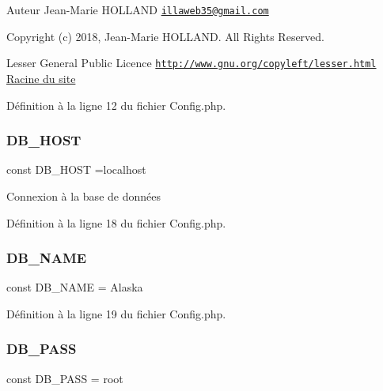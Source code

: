 \begin{DoxyAuthor}{Auteur}
Jean-\/\+Marie H\+O\+L\+L\+A\+ND \href{mailto:illaweb35@gmail.com}{\tt illaweb35@gmail.\+com} 
\end{DoxyAuthor}
\begin{DoxyCopyright}{Copyright}
(c) 2018, Jean-\/\+Marie H\+O\+L\+L\+A\+ND. All Rights Reserved.
\end{DoxyCopyright}
Lesser General Public Licence \href{http://www.gnu.org/copyleft/lesser.html}{\tt http\+://www.\+gnu.\+org/copyleft/lesser.\+html} \hyperlink{}{Racine du site }

Définition à la ligne 12 du fichier Config.\+php.

\mbox{\label{_config_8php_a293363d7988627f671958e2d908c202a}} 
\subsubsection{\texorpdfstring{D\+B\+\_\+\+H\+O\+ST}{DB\_HOST}}
{\footnotesize\ttfamily const D\+B\+\_\+\+H\+O\+ST =\textquotesingle{}localhost\textquotesingle{}}

Connexion à la base de données 

Définition à la ligne 18 du fichier Config.\+php.

\mbox{\label{_config_8php_ab5db0d3504f917f268614c50b02c53e2}} 
\subsubsection{\texorpdfstring{D\+B\+\_\+\+N\+A\+ME}{DB\_NAME}}
{\footnotesize\ttfamily const D\+B\+\_\+\+N\+A\+ME = \textquotesingle{}Alaska\textquotesingle{}}



Définition à la ligne 19 du fichier Config.\+php.

\mbox{\label{_config_8php_a8bb9c4546d91667cfa61879d83127a92}} 
\subsubsection{\texorpdfstring{D\+B\+\_\+\+P\+A\+SS}{DB\_PASS}}
{\footnotesize\ttfamily const D\+B\+\_\+\+P\+A\+SS = \textquotesingle{}root\textquotesingle{}}



